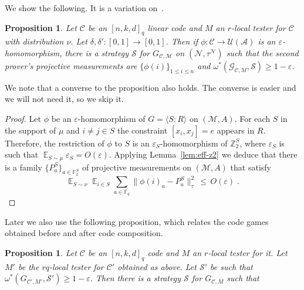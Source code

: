\documentclass[11pt]{article}
\newtheorem{proposition}[theorem]{Proposition}
\theoremstyle{definition}
\newcommand{\code}{\mathscr{C}}
\newcommand{\strategy}{\mathscr{S}}
\DeclareMathOperator*{\Expectation}{\mathbb{E}}
\newcommand{\Es}[1]{\Expectation_{#1}}
\newcommand{\F}{\ensuremath{\mathbb{F}}}
\newcommand{\Z}{\ensuremath{\mathbb{Z}}}
\newcommand{\mA}{\ensuremath{\mathcal{A}}}
\newcommand{\mG}{\ensuremath{\mathcal{G}}}
\newcommand{\mM}{\ensuremath{\mathcal{M}}}
\newcommand{\mU}{\ensuremath{\mathcal{U}}}
\newcommand{\eps}{\varepsilon}
\newcommand{\mN}{\mathcal{N}}
\newcommand{\G}{\mG}
\begin{document}
We show the following. It is a variation on~\cite[Proposition 3.4]{slofstra2019set}.

\begin{proposition}\label{prop:sound-game}
Let $\code$ be an $[n,k,d]_q$ linear code and $M$ an $r$-local tester for $\code$ with distribution $\nu$. Let $\delta,\delta':[0,1]\to[0,1]$. Then if $\phi:\code\to \mU(\mA)$ is an $\eps$-homomorphism, there is a strategy $\strategy$ for $G_{\code,\mM}$ on $(\mN,\tau^\mN)$ such that the second prover's projective measurements are $\{\phi(i)\}_{1\leq i \leq n}$ and $\omega^*(\G_{\code,M},\strategy)\geq 1-\eps$. 
\end{proposition}

We note that a converse to the proposition also holds. The converse is easier and we will not need it, so we skip it. 

\begin{proof}
Let $\phi$ be an $\eps$-homomorphism of $G=\langle S:R\rangle$ on $(\mM,A)$. For each $S$ in the support of $\mu$ and $i\neq j \in S$ the constraint $[x_i,x_j]=e$ appears in $R$. Therefore, the restriction of $\phi$ to $S$ is an $\eps_S$-homomorphism of $\Z_2^S$, where $\eps_S$ is such that $\Es{S\sim \mu} \eps_S = O(\eps)$. Applying Lemma~\ref{lem:eff-z2} we deduce that there is a family $\{P^S_a\}_{a\in \F_2^S}$ of projective measurements on $(\mM,A)$ that satisfy 
\[ \Es{S \sim \nu} \Es{i\in S} \sum_{a \in \F_q} \big\| \phi(i)_a - P^S_a \big\|_\tau^2  \,\leq\,O(\eps)\;.\]
\end{proof}

Later we also use the following proposition, which relates the code games obtained before and after code composition. 


\begin{proposition}\label{prop:q-to-2}
Let $\code$ be an $[n,k,d]_q$ code and $M$ an $r$-local tester for it. Let $M'$ be the $rq$-local tester for $\code'$ obtained as above. Let $\strategy'$ be such that $\omega^*(G_{\code',M'},\strategy')\geq 1-\eps$. Then there is a strategy $\strategy$ for $G_{\code,M}$ such that  
\end{proposition}
\end{document}
